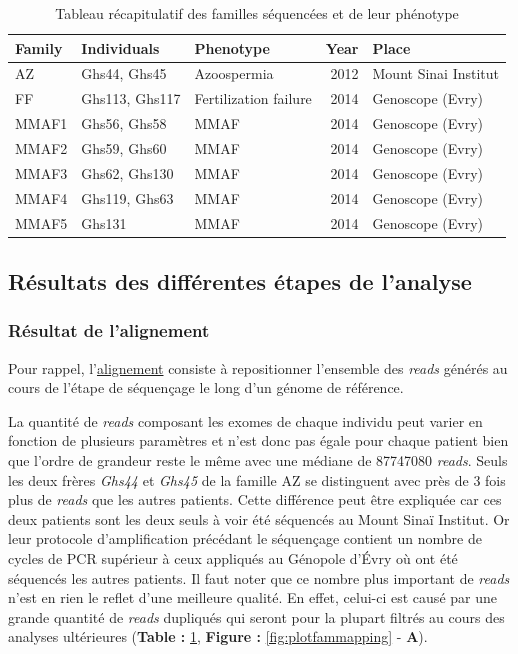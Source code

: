 \documentclass[12pt,a4paper,twoside]{ugathesis}
\theoremstyle{definition}
\theoremstyle{definition}
\theoremstyle{definition}
\theoremstyle{remark}
\begin{document}
\begin{longtable}[t]{lllrl}
\caption{\label{tab:tabfam}Tableau récapitulatif des familles séquencées et de leur phénotype}\\
\toprule
Family & Individuals & Phenotype & Year & Place\\
\midrule
AZ & Ghs44, Ghs45 & Azoospermia & 2012 & Mount Sinai Institut\\
FF & Ghs113, Ghs117 & Fertilization failure & 2014 & Genoscope (Evry)\\
MMAF1 & Ghs56, Ghs58 & MMAF & 2014 & Genoscope (Evry)\\
MMAF2 & Ghs59, Ghs60 & MMAF & 2014 & Genoscope (Evry)\\
MMAF3 & Ghs62, Ghs130 & MMAF & 2014 & Genoscope (Evry)\\
\addlinespace
MMAF4 & Ghs119, Ghs63 & MMAF & 2014 & Genoscope (Evry)\\
MMAF5 & Ghs131 & MMAF & 2014 & Genoscope (Evry)\\
\bottomrule
\end{longtable}

\newpage 

\subsection{Résultats des différentes étapes de
l'analyse}\label{resultats-des-differentes-etapes-de-lanalyse}

\subsubsection{Résultat de l'alignement}\label{resultat-de-lalignement}

Pour rappel, l'\protect\hyperlink{lalignement}{alignement} consiste à
repositionner l'ensemble des \emph{reads} générés au cours de l'étape de
séquençage le long d'un génome de référence.

La quantité de \emph{reads} composant les exomes de chaque individu peut
varier en fonction de plusieurs paramètres et n'est donc pas égale pour
chaque patient bien que l'ordre de grandeur reste le même avec une
médiane de 87747080 \emph{reads}. Seuls les deux frères \emph{Ghs44} et
\emph{Ghs45} de la famille AZ se distinguent avec près de 3 fois plus de
\emph{reads} que les autres patients. Cette différence peut être
expliquée car ces deux patients sont les deux seuls à voir été séquencés
au Mount Sinaï Institut. Or leur protocole d'amplification précédant le
séquençage contient un nombre de cycles de PCR supérieur à ceux
appliqués au Génopole d'Évry où ont été séquencés les autres patients.
Il faut noter que ce nombre plus important de \emph{reads} n'est en rien
le reflet d'une meilleure qualité. En effet, celui-ci est causé par une
grande quantité de \emph{reads} dupliqués qui seront pour la plupart
filtrés au cours des analyses ultérieures (\textbf{Table :}
\ref{tab:tabfam}, \textbf{Figure : }\ref{fig:plotfammapping} -
\textbf{A}).
\end{document}
